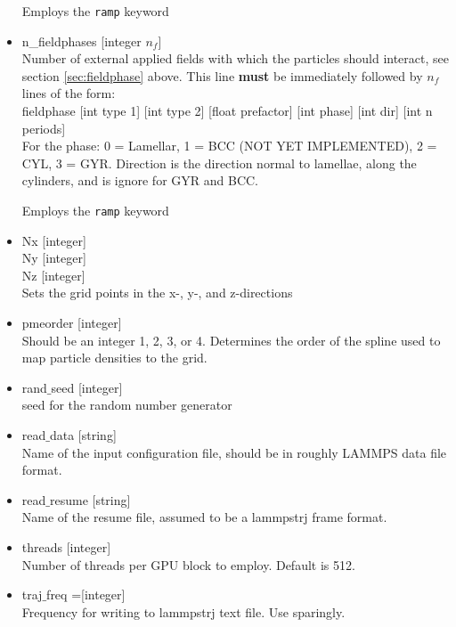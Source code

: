 \documentclass[12pt]{article}
\begin{document}
\begin{itemize}
	Employs the \verb+ramp+ keyword
	
  \item
    n\_fieldphases [integer $n_f$]
    \\[8pt]
    Number of external applied fields with which the particles should interact, see section \ref{sec:fieldphase} above. This line {\bf must} be immediately followed by $n_f$ lines of the form:
    \\[8pt]
    fieldphase [int type 1] [int type 2] [float prefactor] [int phase] [int dir] [int n periods]
    \\[8pt]
    For the phase: 0 = Lamellar, 1 = BCC (NOT YET IMPLEMENTED), 2 = CYL, 3 = GYR. Direction is the direction normal to lamellae, along the cylinders, and is ignore for GYR and BCC.

	Employs the \verb+ramp+ keyword



      \item
    Nx [integer]
    \\
    Ny [integer]
    \\
    Nz [integer]
    \\[8pt]
    Sets the grid points in the x-, y-, and z-directions

    
  \item
    pmeorder [integer]
    \\[8pt]
    Should be an integer 1, 2, 3, or 4. Determines the order of the spline used to map particle densities to the grid.


    \item
    rand$\_$seed [integer]
    \\[8pt]
    seed for the random number generator
    
      \item
    read$\_$data [string]
    \\[8pt]
    Name of the input configuration file, should be in roughly LAMMPS data file format.

  \item
    read$\_$resume [string]
    \\[8pt]
    Name of the resume file, assumed to be a lammpstrj frame format.

    
  \item
    threads [integer]
    \\[8pt]
    Number of threads per GPU block to employ. Default is 512.
    
    
    

  \item
    traj$\_$freq =[integer]
    \\[8pt]
    Frequency for writing to lammpstrj text file. Use sparingly.


\end{itemize}
\end{document}
